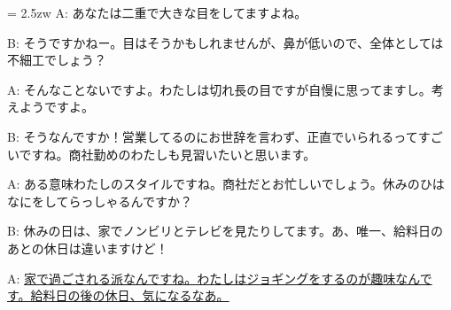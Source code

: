 \documentclass[11pt]{amsart}
\title{}
\author{}
\newenvironment{hangall}[1]{\hangindent = 2.5zw\everypar{\hangindent = 2.5zw}}{}
\begin{document}
\maketitle
\begin{hangall}{}%
A: あなたは二重で大きな目をしてますよね。

B: そうですかねー。目はそうかもしれませんが、鼻が低いので、全体としては不細工でしょう？

A: そんなことないですよ。わたしは切れ長の目ですが自慢に思ってますし。考えようですよ。

B: そうなんですか！営業してるのにお世辞を言わず、正直でいられるってすごいですね。商社勤めのわたしも見習いたいと思います。

A: ある意味わたしのスタイルですね。商社だとお忙しいでしょう。休みのひはなにをしてらっしゃるんですか？

B: 休みの日は、家でノンビリとテレビを見たりしてます。あ、唯一、給料日のあとの休日は違いますけど！

A: \ul{家で過ごされる派なんですね。わたしはジョギングをするのが趣味なんです。給料日の後の休日、気になるなあ。}\end{hangall}
\end{document}
